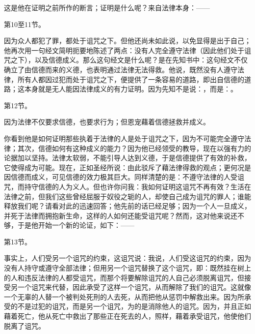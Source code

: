 这是他在证明之前所作的断言；证明是什么呢？来自法律本身：——\par

第10至11节。\par

因为众人都犯了罪，都处于诅咒之下。但他还尚未如此说，以免显得是出于自己；他再次用一句经文简明扼要地陈述了两点：没有人完全遵守法律（因此他们处于诅咒之下），以及信德成义。那么这句经文是什么呢？是在先知书中：这句经文不仅确立了由信德而来的义德，也表明通过法律无法得救。他说，既然没有人遵守法律，所有人都因过犯而处于诅咒之下，便提供了一条容易的道路，即出自信德的道路；这本身就是无人能因法律成义的有力证明。因为先知不是说：，而是：。\par

第12节。\par

因为法律不仅要求信德，也要求行为；但恩宠藉着信德拯救并成义。\par

你看到他是如何证明那些执着于法律的人是处于诅咒之下，因为不可能完全遵守法律；其次，信德如何有这种成义的能力？因为他已经领受的教导，现在以强有力的论据加以坚持。法律太软弱，不能引导人达到义德，于是信德提供了有效的补救，它使得成为可能。现在，正如圣经所说：由此驳斥了藉法律得救的观点；更何况是因信德而成义，可见信德的效力极其巨大。同样清楚的是：不遵守法律的人受诅咒，而持守信德的人为义人。但也许你问我：我如何证明这诅咒不再有效？生活在法律之前，但我们这些曾经屈服于奴役之轭的人，却使自己成为诅咒的罪人；谁能释放我们呢？请看对此的迅速回答；他先前的话已经足够；因为一个人一旦成义，并死于法律而拥抱新生命，这样的人如何还能受诅咒呢？然而，这对他来说还不够，于是他开始一个新的论证，如下：——\par

第13节。\par

事实上，人们受另一个诅咒的约束，这诅咒说：我说，人们受这诅咒的约束，因为没有人持守或遵守全部法律；但用另一个诅咒替换了这个诅咒，即：既然挂在树上的人和违反法律的人都受诅咒，而那个将要解除诅咒的人自己必须脱离诅咒，但接受另一个诅咒来代替，因此承受了这样一个诅咒，从而解除了我们的诅咒。这就像一个无辜的人替一个被判处死刑的人去死，从而把他从惩罚中解救出来。因为所承受的不是过犯的诅咒，而是另一个诅咒，为的是消除他人的诅咒。因为，并且正如藉着死亡，他从死亡中救出了那些正在死去的人，照样，藉着承受诅咒，他使他们脱离了诅咒。\par

